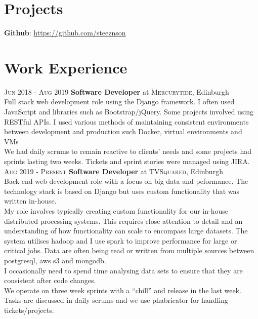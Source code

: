 \documentclass[14pt, a4paper]{extarticle}
\begin{document}
\begin{multicols}{2}
\section{Projects}
\noindent\textbf{Github}: \url{https://github.com/steeznson}

\columnbreak
\section{Work Experience}
\noindent\textsc{Jun 2018 - Aug 2019} \textbf{Software Developer}
at \textsc{Mercurytide}, Edinburgh\\
Full stack web development role using the Django framework. I often used JavaScript and libraries such as Bootstrap/jQuery. Some projects involved using RESTful APIs. I used various methods of maintaining consistent environments between development and production such Docker, virtual environments and VMs\\
We had daily scrums to remain reactive to clients' needs and some projects had sprints lasting two weeks. Tickets and sprint stories were managed using JIRA.\\
\noindent\textsc{Aug 2019 - Present} \textbf{Software Developer}
at \textsc{TVSquared}, Edinburgh\\
Back end web development role with a focus on big data and peformance. The technology stack is based on Django but uses custom functionality that was written in-house.\\ 
My role involves typically creating custom functionality for our in-house distributed processing systems. This requires close attention to detail and an understanding of how functionality can scale to encompass large datasets. The system utilises hadoop and I use spark to improve performance for large or critical jobs. Data are often being read or written from multiple sources between postgresql, aws s3 and mongodb.\\
I occasionally need to spend time analysing data sets to ensure that they are consistent after code changes.\\
We operate on three week sprints with a ``chill'' and release in the last week.  Tasks are discussed in daily scrums and we use phabricator for handling tickets/projects.
\end{multicols}
\end{document}
